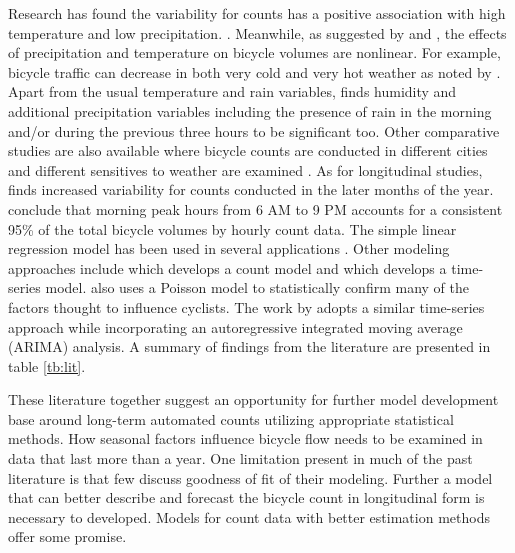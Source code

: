 \documentclass[12pt,letterpaper,article,twocolumn]{memoir}
\begin{document}
Research has found the variability for counts has a positive
association with high temperature and low precipitation. \parencite{Niemeier:1996aa,Parkin:2008aa}. Meanwhile, as suggested by
\textcite{Lewin:2011aa} and \textcite{Thomas:2009aa}, the effects of
precipitation and temperature on bicycle volumes are nonlinear. For
example, bicycle traffic can decrease in both very cold and very hot
weather as noted by \textcite{Richardson:2000aa}. Apart from the usual
temperature and rain variables, \textcite{Miranda-Moreno:2011aa} finds
humidity and additional precipitation variables including the presence
of rain in the morning and/or during the previous three hours to be
significant too. Other comparative studies are also available where
bicycle counts are conducted in different cities and different
sensitives to weather are examined \parencite{Rose:2011aa}. As for
longitudinal studies, \textcite{Niemeier:1996aa} finds increased variability
for counts conducted in the later months of the year.
\textcite{Jones:2010aa} conclude that morning peak hours from 6 AM to 9 PM
accounts for a consistent 95\% of the total bicycle volumes by hourly
count data. The simple linear regression model has been used in
several applications \cite{Jones:2008aa,Jones:2010aa}. Other modeling approaches include \cite{Miranda-Moreno:2011aa} which develops a count
model and \cite{Thomas:2009aa} which develops a time-series model.
\cite{Niemeier:1996aa} also uses a Poisson model to statistically
confirm  many of the factors thought to influence cyclists. The
work by \cite{Gallop:2012aa} adopts a similar time-series approach
while incorporating an autoregressive integrated moving average
(ARIMA) analysis. A summary of findings from the literature are
presented in table \ref{tb:lit}.

These literature together suggest an opportunity for further model
development base around long-term automated counts utilizing
appropriate statistical methods. How seasonal factors influence
bicycle flow needs to be examined in data that last more than a year.
One limitation present in much of the past literature is that few
discuss goodness of fit of their modeling. Further a model that can
better describe and forecast the bicycle count in longitudinal form is
necessary to developed. Models for count data with better estimation
methods offer some promise.
 
\end{document}
